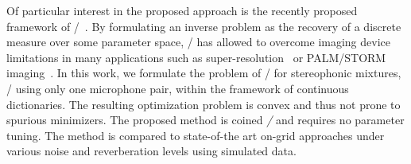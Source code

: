 \mynewline
Of particular interest in the proposed approach is the recently proposed framework of \CDdef/~.
By formulating an inverse problem as the recovery of a discrete measure over some parameter space, \CD/ has allowed to overcome imaging device limitations in many applications such as super-resolution~ or PALM/STORM imaging~.
In this work, we formulate the problem of \AER/ for stereophonic mixtures, \ie/ using only one microphone pair, within the framework of continuous dictionaries.
The resulting optimization problem is convex and thus not prone to spurious minimizers.
The proposed method is coined \emph{\BLASTERdef/} and requires no parameter tuning.
The method is compared to state-of-the art on-grid approaches under various noise and reverberation levels using simulated data.


